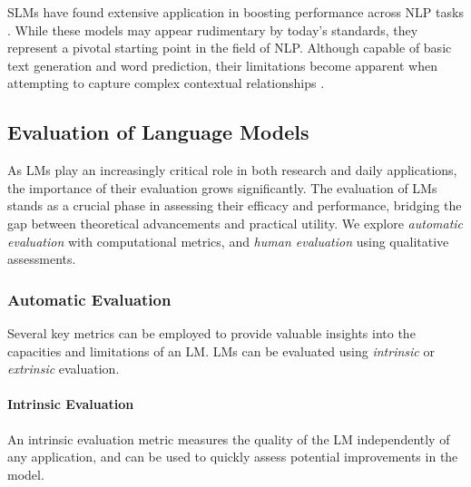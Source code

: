 
\acp{SLM} have found extensive application in boosting performance across \ac{NLP} tasks \citep{bahl1989tree, thede1999second}. While these models may appear rudimentary by today's standards, they represent a pivotal starting point in the field of \ac{NLP}. Although capable of basic text generation and word prediction, their limitations become apparent when attempting to capture complex contextual relationships \citep{rosenfeld2000two, arisoy2012deep}.


\subsection{Evaluation of Language Models}

As \acp{LM} play an increasingly critical role in both research and daily applications, the importance of their evaluation grows significantly. The evaluation of \acp{LM} stands as a crucial phase in assessing their efficacy and performance, bridging the gap between theoretical advancements and practical utility. We explore \textit{automatic evaluation} with computational metrics, and \textit{human evaluation} using qualitative assessments. 

\subsubsection{Automatic Evaluation} 

Several key metrics can be employed to provide valuable insights into the capacities and limitations of an \ac{LM}. \acp{LM} can be evaluated using \textit{intrinsic} or \textit{extrinsic} evaluation. 

\paragraph{Intrinsic Evaluation} An intrinsic evaluation metric measures the quality of the \ac{LM} independently of any application, and can be used to quickly assess potential improvements in the model.

